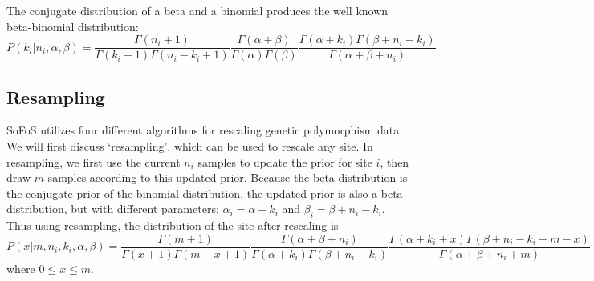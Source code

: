 \documentclass[11pt,letterpaper]{article}
\begin{document}

The conjugate distribution of a beta and a binomial produces the well known beta-binomial distribution:
\[
P(k_i|n_i,\alpha,\beta) =  \frac{\Gamma(n_i+1)}{\Gamma(k_i+1) \Gamma(n_i-k_i+1)}%
\frac{\Gamma(\alpha+\beta)}{\Gamma(\alpha)\Gamma(\beta)}%
\frac{\Gamma(\alpha+k_i)\Gamma(\beta+n_i-k_i)}{\Gamma(\alpha+\beta+n_i)}
\]

\subsection{Resampling}



SoFoS utilizes four different algorithms for rescaling genetic polymorphism data.  We will first discuss `resampling', which can be used to rescale any site.  In resampling, we first use the current $n_i$ samples to update the prior for site $i$, then draw $m$ samples according to this updated prior.  Because the beta distribution is the conjugate prior of the binomial distribution, the updated prior is also a beta distribution, but with different parameters:  $\alpha_i = \alpha + k_i$ and $\beta_i = \beta + n_i-k_i$.  Thus using resampling, the distribution of the site after rescaling is
\[
P(x|m,n_i,k_i,\alpha,\beta) =  \frac{\Gamma(m+1)}{\Gamma(x+1) \Gamma(m-x+1)}%
\frac{\Gamma(\alpha+\beta+n_i)}{\Gamma(\alpha+k_i)\Gamma(\beta+n_i-k_i)}%
\frac{\Gamma(\alpha+k_i+x)\Gamma(\beta+n_i-k_i+m-x)}{\Gamma(\alpha+\beta+n_i+m)}
\]
where $0 \le x \le m$.


\end{document}

